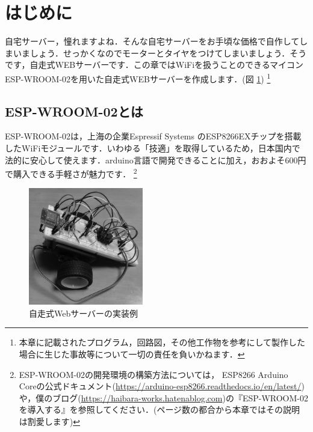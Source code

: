 \section{はじめに}
自宅サーバー，憧れますよね．そんな自宅サーバーをお手頃な価格で自作してしまいましょう．せっかくなのでモーターとタイヤをつけてしまいましょう．そうです，自走式WEBサーバーです．この章ではWiFiを扱うことのできるマイコン ESP-WROOM-02を用いた自走式WEBサーバーを作成します．(図 \ref{fig:webserver})
\footnote{本章に記載されたプログラム，回路図，その他工作物を参考にして製作した場合に生じた事故等について一切の責任を負いかねます．}
\subsection{ESP-WROOM-02とは}
ESP-WROOM-02は，上海の企業Espressif Systems のESP8266EXチップを搭載したWiFiモジュールです．いわゆる「技適」を取得しているため，日本国内で法的に安心して使えます．arduino言語で開発できることに加え，おおよそ600円で購入できる手軽さが魅力です．
\footnote{ESP-WROOM-02の開発環境の構築方法については， ESP8266 Arduino Coreの公式ドキュメント(\url{https://arduino-esp8266.readthedocs.io/en/latest/})や，僕のブログ(\url{https://haibara-works.hatenablog.com})の『ESP-WROOM-02を導入する』を参照してください．(ページ数の都合から本章ではその説明は割愛します)}

\begin{figure}[htbp]
    \centering
    \includegraphics[width=50mm]{./assets/haibaraaaaaaaasset/webserver.jpg}
    \caption{自走式Webサーバーの実装例}
    \label{fig:webserver}
\end{figure}

